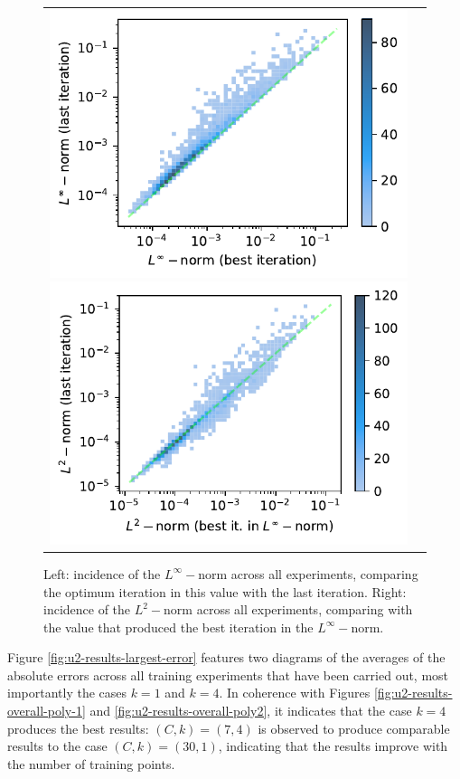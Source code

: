 \documentclass[12pt]{report} %
\begin{document}
\begin{figure}
  \hspace*{-2cm}
  \begin{tabular}{cc}
    \includegraphics[width=.6\textwidth]{imagenes/experiments/1d/statistical_1d_full_scheduler_interpolation/incidence_of_linf.pdf}
    \includegraphics[width=.6\textwidth]{imagenes/experiments/1d/statistical_1d_full_scheduler_interpolation/incidence_of_l2.pdf}
  \end{tabular}
  \caption{Left: incidence of the $L^\infty-$norm across all experiments, comparing the optimum iteration in this value with the last iteration. Right: incidence of the $L^2-$norm across all experiments, comparing with the value that produced the best iteration in the $L^\infty-$norm.}
  \label{fig:u2-results-incidence-l-norms}
\end{figure}

Figure \ref{fig:u2-results-largest-error} features two diagrams of the averages of the absolute errors across all training experiments that have been carried out, most importantly the cases $k=1$ and $k=4$. In coherence with Figures \ref{fig:u2-results-overall-poly-1} and \ref{fig:u2-results-overall-poly2}, it indicates that the case $k=4$ produces the best results: $(C,k)=(7,4)$ is observed to produce comparable results to the case $(C,k)=(30,1)$, indicating that the results improve with the number of training points.
\end{document}
